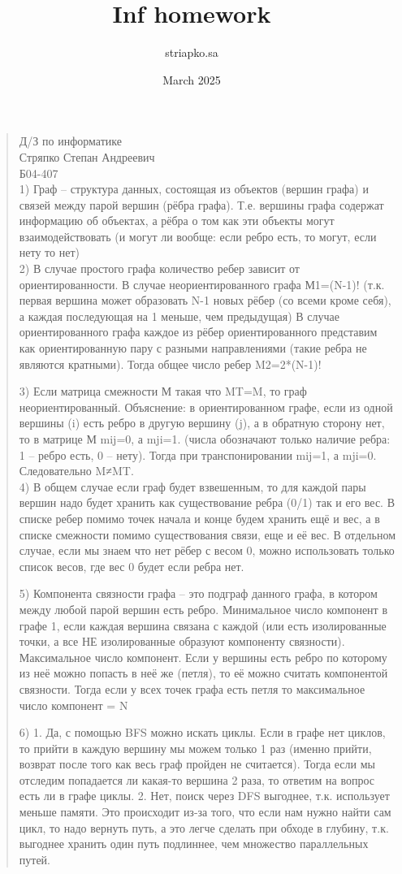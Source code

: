 \documentclass{article}
\title{Inf homework}
\author{striapko.sa }
\date{March 2025}
\begin{document}
\begin{quote}
Д/З по информатике\\
Стряпко Степан Андреевич\\
Б04-407\\


1)	Граф – структура данных, состоящая из объектов (вершин графа) и связей между парой вершин (рёбра графа). Т.е. вершины графа содержат информацию об объектах, а рёбра о том как эти объекты могут взаимодействовать (и могут ли вообще: если ребро есть, то могут, если нету то нет)\\


2)	В случае простого графа количество ребер зависит от ориентированности. В случае неориентированного графа М1=(N-1)! (т.к. первая вершина может образовать N-1 новых рёбер (со всеми кроме себя), а каждая последующая на 1 меньше, чем предыдущая) В случае ориентированного графа каждое из рёбер ориентированного представим как ориентированную пару с разными направлениями (такие ребра не являются кратными). Тогда общее число ребер M2=2*(N-1)!


3)	Если матрица смежности М такая что MT=M, то граф неориентированный. Объяснение: в ориентированном графе, если из одной вершины (i) есть ребро в другую вершину (j), а в обратную сторону нет, то в матрице М mij=0, а mji=1. (числа обозначают только наличие ребра: 1 – ребро есть, 0 – нету). Тогда при транспонировании mij=1, а mji=0. Следовательно M≠MT. \\


4)	В общем случае если граф будет взвешенным, то для каждой пары вершин надо будет хранить как существование ребра (0/1) так и его вес. В списке ребер помимо точек начала и конце будем хранить ещё и вес, а в списке смежности помимо существования связи, еще и её вес. В отдельном случае, если мы знаем что нет рёбер с весом 0, можно использовать только список весов, где вес 0 будет если ребра нет.


5)	Компонента связности графа – это подграф данного графа, в котором между любой парой вершин есть ребро. Минимальное число компонент в графе 1, если каждая вершина связана с каждой (или есть изолированные точки, а все НЕ изолированные образуют компоненту связности). Максимальное число компонент. Если у вершины есть ребро по которому из неё можно попасть в неё же (петля), то её можно считать компонентой связности. Тогда если у всех точек графа есть петля то максимальное число компонент = N


6)	1. Да, с помощью BFS можно искать циклы. Если в графе нет циклов, то прийти в каждую вершину мы можем только 1 раз (именно прийти, возврат после того как весь граф пройден не считается). Тогда если мы отследим попадается ли какая-то вершина 2 раза, то ответим на вопрос есть ли в графе циклы.  2. Нет, поиск через DFS выгоднее, т.к. использует меньше памяти. Это происходит из-за того, что если нам нужно найти сам цикл, то надо вернуть путь, а это легче сделать при обходе в глубину, т.к. выгоднее хранить один путь подлиннее, чем множество параллельных путей.



\end{quote}
\end{document}
